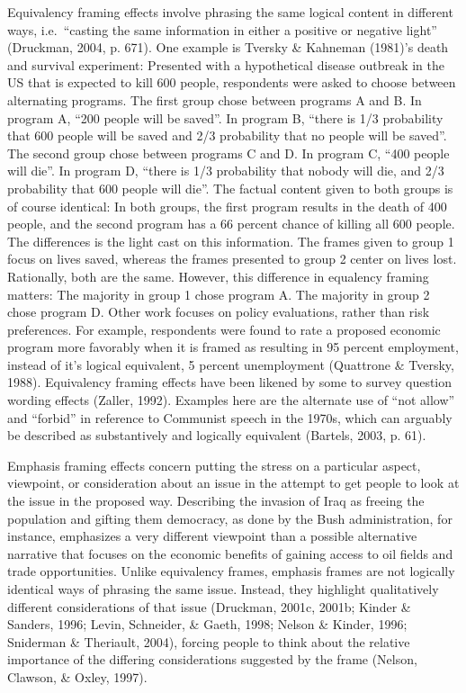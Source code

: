 \documentclass[12pt,econ]{sources/authesis}
\begin{document}
Equivalency framing effects involve phrasing the same logical content in different ways, i.e.~``casting the same information in either a positive or negative light'' (Druckman, 2004, p. 671). One example is Tversky \& Kahneman (1981)'s death and survival experiment: Presented with a hypothetical disease outbreak in the US that is expected to kill 600 people, respondents were asked to choose between alternating programs. The first group chose between programs A and B. In program A, ``200 people will be saved''. In program B, ``there is 1/3 probability that 600 people will be saved and 2/3 probability that no people will be saved''. The second group chose between programs C and D. In program C, ``400 people will die''. In program D, ``there is 1/3 probability that nobody will die, and 2/3 probability that 600 people will die''. The factual content given to both groups is of course identical: In both groups, the first program results in the death of 400 people, and the second program has a 66 percent chance of killing all 600 people. The differences is the light cast on this information. The frames given to group 1 focus on lives saved, whereas the frames presented to group 2 center on lives lost. Rationally, both are the same. However, this difference in equalency framing matters: The majority in group 1 chose program A. The majority in group 2 chose program D. Other work focuses on policy evaluations, rather than risk preferences. For example, respondents were found to rate a proposed economic program more favorably when it is framed as resulting in 95 percent employment, instead of it's logical equivalent, 5 percent unemployment (Quattrone \& Tversky, 1988). Equivalency framing effects have been likened by some to survey question wording effects (Zaller, 1992). Examples here are the alternate use of ``not allow'' and ``forbid'' in reference to Communist speech in the 1970s, which can arguably be described as substantively and logically equivalent (Bartels, 2003, p. 61).

Emphasis framing effects concern putting the stress on a particular aspect, viewpoint, or consideration about an issue in the attempt to get people to look at the issue in the proposed way. Describing the invasion of Iraq as freeing the population and gifting them democracy, as done by the Bush administration, for instance, emphasizes a very different viewpoint than a possible alternative narrative that focuses on the economic benefits of gaining access to oil fields and trade opportunities. Unlike equivalency frames, emphasis frames are not logically identical ways of phrasing the same issue. Instead, they highlight qualitatively different considerations of that issue (Druckman, 2001c, 2001b; Kinder \& Sanders, 1996; Levin, Schneider, \& Gaeth, 1998; Nelson \& Kinder, 1996; Sniderman \& Theriault, 2004), forcing people to think about the relative importance of the differing considerations suggested by the frame (Nelson, Clawson, \& Oxley, 1997).
\end{document}
